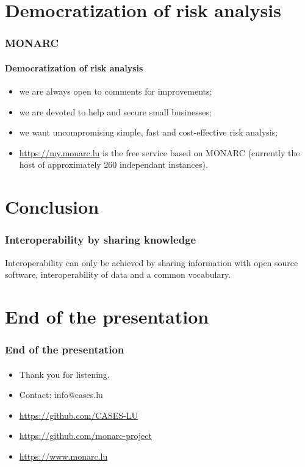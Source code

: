\documentclass[]{beamer}
\begin{document}
\section{Democratization of risk analysis}
\begin{frame}
    \frametitle{MONARC}
    \framesubtitle{Democratization of risk analysis}
    \begin{center}
        \begin{itemize}
            \item we are always open to comments for improvements;
            \item we are devoted to help and secure small businesses;
            \item we want uncompromising simple, fast and cost-effective risk analysis;
            \item \url{https://my.monarc.lu} is the free service based on MONARC (currently the host of approximately 260 independant instances).
        \end{itemize}
    \end{center}
\end{frame}



\section*{Conclusion}
\begin{frame}
    \frametitle{Interoperability by sharing knowledge}
    \begin{center}
        Interoperability can only be achieved by sharing information with open source
        software, interoperability of data and a common vocabulary.
    \end{center}
\end{frame}


%
%
\section*{End of the presentation}
\begin{frame}
    \frametitle{End of the presentation}
    \framesubtitle{}
    \begin{center}
        \begin{itemize}
            \item Thank you for listening.
            \item Contact: info@cases.lu
            \item \url{https://github.com/CASES-LU}
            \item \url{https://github.com/monarc-project}
            \item \url{https://www.monarc.lu}
        \end{itemize}
    \end{center}
\end{frame}
\end{document}
